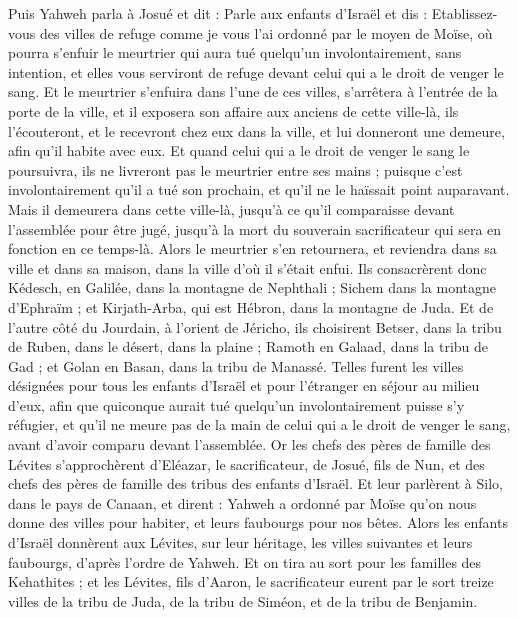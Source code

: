 \begin{multicols}{2}
\VerseOne{}Puis Yahweh parla à Josué et dit :
Parle aux enfants d'Israël et dis : Etablissez-vous des villes de refuge comme je vous l'ai ordonné par le moyen de Moïse,
où pourra s'enfuir le meurtrier qui aura tué quelqu'un involontairement, sans intention, et elles vous serviront de refuge devant celui qui a le droit de venger le sang.
Et le meurtrier s'enfuira dans l'une de ces villes, s'arrêtera à l'entrée de la porte de la ville, et il exposera son affaire aux anciens de cette ville-là, ils l'écouteront, et le recevront chez eux dans la ville, et lui donneront une demeure, afin qu'il habite avec eux.
Et quand celui qui a le droit de venger le sang le poursuivra, ils ne livreront pas le meurtrier entre ses mains ; puisque c'est involontairement qu'il a tué son prochain, et qu'il ne le haïssait point auparavant.
Mais il demeurera dans cette ville-là, jusqu'à ce qu'il comparaisse devant l'assemblée pour être jugé, jusqu'à la mort du souverain sacrificateur qui sera en fonction en ce temps-là. Alors le meurtrier s'en retournera, et reviendra dans sa ville et dans sa maison, dans la ville d'où il s'était enfui.
Ils consacrèrent donc Kédesch, en Galilée, dans la montagne de Nephthali ; Sichem dans la montagne d'Ephraïm ; et Kirjath-Arba, qui est Hébron, dans la montagne de Juda.
Et de l'autre côté du Jourdain, à l'orient de Jéricho, ils choisirent Betser, dans la tribu de Ruben, dans le désert, dans la plaine ; Ramoth en Galaad, dans la tribu de Gad ; et Golan en Basan, dans la tribu de Manassé.
Telles furent les villes désignées pour tous les enfants d'Israël et pour l'étranger en séjour au milieu d'eux, afin que quiconque aurait tué quelqu'un involontairement puisse s'y réfugier, et qu'il ne meure pas de la main de celui qui a le droit de venger le sang, avant d'avoir comparu devant l'assemblée.
\VerseOne{}Or les chefs des pères de famille des Lévites s'approchèrent d'Eléazar, le sacrificateur, de Josué, fils de Nun, et des chefs des pères de famille des tribus des enfants d'Israël.
Et leur parlèrent à Silo, dans le pays de Canaan, et dirent : Yahweh a ordonné par Moïse qu'on nous donne des villes pour habiter, et leurs faubourgs pour nos bêtes.
Alors les enfants d'Israël donnèrent aux Lévites, sur leur héritage, les villes suivantes et leurs faubourgs, d'après l'ordre de Yahweh.
Et on tira au sort pour les familles des Kehathites ; et les Lévites, fils d'Aaron, le sacrificateur eurent par le sort treize villes de la tribu de Juda, de la tribu de Siméon, et de la tribu de Benjamin.

\end{multicols}
